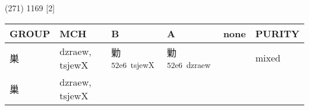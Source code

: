 \documentclass[14pt,a4paper]{scrartcl}
\begin{document}
(271) 1169 {[}2{]}

\begin{longtable}[c]{@{}llllll@{}}
\toprule
\begin{minipage}[b]{0.14\columnwidth}\raggedright\strut
GROUP
\strut\end{minipage} &
\begin{minipage}[b]{0.14\columnwidth}\raggedright\strut
MCH
\strut\end{minipage} &
\begin{minipage}[b]{0.14\columnwidth}\raggedright\strut
B
\strut\end{minipage} &
\begin{minipage}[b]{0.14\columnwidth}\raggedright\strut
A
\strut\end{minipage} &
\begin{minipage}[b]{0.14\columnwidth}\raggedright\strut
none
\strut\end{minipage} &
\begin{minipage}[b]{0.14\columnwidth}\raggedright\strut
PURITY
\strut\end{minipage}\tabularnewline
\midrule
\endhead
\begin{minipage}[t]{0.14\columnwidth}\raggedright\strut
巣
\strut\end{minipage} &
\begin{minipage}[t]{0.14\columnwidth}\raggedright\strut
dzraew, tsjewX
\strut\end{minipage} &
\begin{minipage}[t]{0.14\columnwidth}\raggedright\strut
勦\textsuperscript{52e6~tsjewX}
\strut\end{minipage} &
\begin{minipage}[t]{0.14\columnwidth}\raggedright\strut
勦\textsuperscript{52e6~dzraew}
\strut\end{minipage} &
\begin{minipage}[t]{0.14\columnwidth}\raggedright\strut
\strut\end{minipage} &
\begin{minipage}[t]{0.14\columnwidth}\raggedright\strut
mixed
\strut\end{minipage}\tabularnewline
\begin{minipage}[t]{0.14\columnwidth}\raggedright\strut
巢
\strut\end{minipage} &
\begin{minipage}[t]{0.14\columnwidth}\raggedright\strut
dzraew, tsjewX
\strut\end{minipage} &
\begin{minipage}[t]{0.14\columnwidth}\raggedright\strut

\end{minipage}
\end{longtable}
\end{document}
